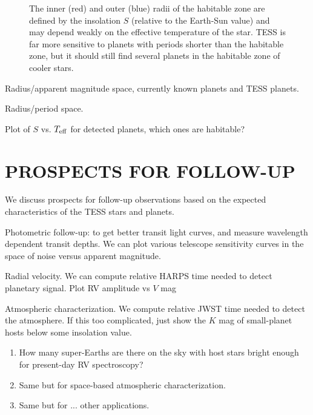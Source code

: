 \documentclass{emulateapj}
\begin{document}
\begin{figure}[ht]
\caption{The inner (red) and outer (blue) radii of the habitable zone are defined by the insolation $S$ (relative to the Earth-Sun value) and may depend weakly on the effective temperature of the star. TESS is far more sensitive to planets with periods shorter than the habitable zone, but it should still find several planets in the habitable zone of cooler stars.}
\end{figure}


Radius/apparent magnitude space, currently known planets and TESS
planets.
 
Radius/period space.

Plot of $S$ vs. $T_{\rm eff}$ for detected planets, which ones are
habitable?

\section{PROSPECTS FOR FOLLOW-UP}
\label{sec:followup}
We discuss prospects for follow-up observations based on the expected
characteristics of the TESS stars and planets.

Photometric follow-up: to get better transit light curves, and measure
wavelength dependent transit depths.  We can plot various telescope
sensitivity curves in the space of noise versus apparent magnitude.

Radial velocity. We can compute relative HARPS time needed to detect
planetary signal. Plot RV amplitude vs $V$ mag

Atmospheric characterization. We compute relative JWST time needed to
detect the atmosphere. If this too complicated, just show the $K$ mag of small-planet hosts below some insolation value.

\begin{enumerate}
\item How many super-Earths are there on the sky with host stars bright
   enough for present-day RV spectroscopy?
\item Same but for space-based atmospheric characterization.
\item Same but for ... other applications.
\end{enumerate}

%
\end{document}
